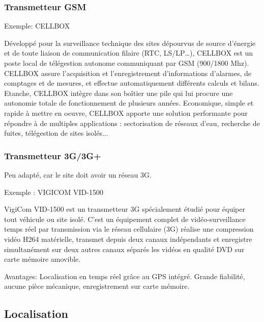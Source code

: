 \subsubsection{Transmetteur GSM}

Exemple: CELLBOX

Développé pour la surveillance technique des sites dépourvus de source d’énergie et de toute liaison de communication filaire (RTC, LS/LP…), CELLBOX est un poste local de télégestion autonome communiquant par GSM (900/1800 Mhz).
CELLBOX assure l’acquisition et l’enregistrement d’informations d’alarmes, de comptages et de mesures, et effectue automatiquement différents calculs et bilans.
Etanche, CELLBOX intègre dans son boîtier une pile qui lui procure une autonomie totale de fonctionnement de plusieurs années.
Economique, simple et rapide à mettre en oeuvre, CELLBOX apporte une solution performante pour répondre à de multiples applications : sectorisation de réseaux d’eau, recherche de fuites, télégestion de sites isolés...


\subsubsection{Transmetteur 3G/3G+}

Peu adapté, car le site doit avoir un réseau 3G.

Exemple : VIGICOM VID-1500

\begin{figure}
\begin{center}


\end{center}
\end{figure}

VigiCom VID-1500 est un transmetteur  3G spécialement étudié pour équiper tout véhicule ou site isolé. C’est un équipement complet de vidéo-surveillance temps réel par transmission via le réseau cellulaire (3G) réalise une compression vidéo H264 matérielle, transmet depuis deux canaux indépendants et enregistre simultanément sur deux autres canaux séparés les vidéos en qualité DVD sur carte mémoire amovible.

Avantages:
Localisation en temps réel grâce au GPS intégré. 
Grande fiabilité, aucune pièce mécanique, enregistrement sur carte mémoire.
\subsection{Localisation}

